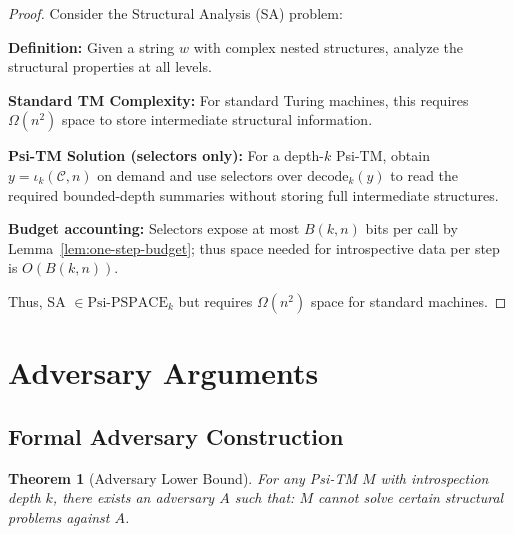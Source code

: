 \documentclass[11pt]{article}
\newtheorem{theorem}{Theorem}
\begin{document}
\begin{proof}
Consider the Structural Analysis (SA) problem:

\textbf{Definition:} Given a string $w$ with complex nested structures, analyze the structural properties at all levels.

\textbf{Standard TM Complexity:}
For standard Turing machines, this requires $\Omega(n^2)$ space to store intermediate structural information.

\textbf{Psi-TM Solution (selectors only):}
For a depth-$k$ Psi-TM, obtain $y=\iota_k(\mathcal{C},n)$ on demand and use selectors over $\mathrm{decode}_k(y)$ to read the required bounded-depth summaries without storing full intermediate structures.

\textbf{Budget accounting:}
Selectors expose at most $B(k,n)$ bits per call by Lemma~\ref{lem:one-step-budget}; thus space needed for introspective data per step is $O(B(k,n))$.

Thus, SA $\in \text{Psi-PSPACE}_k$ but requires $\Omega(n^2)$ space for standard machines.
\end{proof}

\section{Adversary Arguments}

\subsection{Formal Adversary Construction}

\begin{theorem}[Adversary Lower Bound]
For any Psi-TM $M$ with introspection depth $k$, there exists an adversary $A$ such that:
$M$ cannot solve certain structural problems against $A$.
\end{theorem}
\end{document}
